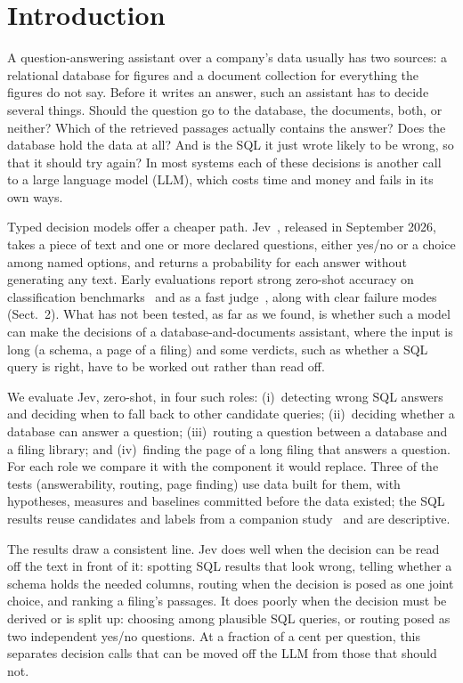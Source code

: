 \documentclass[runningheads,a4paper]{llncs}
\begin{document}
\section{Introduction}
A question-answering assistant over a company's data usually has two sources: a relational database for figures
and a document collection for everything the figures do not say. Before it writes an answer, such an assistant has
to decide several things. Should the question go to the database, the documents, both, or neither? Which of the
retrieved passages actually contains the answer? Does the database hold the data at all? And is the SQL it just
wrote likely to be wrong, so that it should try again? In most systems each of these decisions is another call to a
large language model (LLM), which costs time and money and fails in its own ways.

Typed decision models offer a cheaper path. Jev~\cite{typesafe2026jev}, released in September 2026, takes a piece of
text and one or more declared questions, either yes/no or a choice among named options, and returns a probability
for each answer without generating any text. Early evaluations report strong zero-shot accuracy on classification benchmarks~\cite{deusser2026jev} and as a fast
judge~\cite{li2026jevjudge}, along with clear failure modes (Sect.~2). What has not been tested, as far as we found, is whether such a
model can make the decisions of a database-and-documents assistant, where the input is long (a schema, a page of a
filing) and some verdicts, such as whether a SQL query is right, have to be worked out rather than read off.

We evaluate Jev, zero-shot, in four such roles: (i)~detecting wrong SQL answers and deciding when to fall back to
other candidate queries; (ii)~deciding whether a database can answer a question; (iii)~routing a question between
a database and a filing library; and (iv)~finding the page of a long filing that answers a question. For each role
we compare it with the component it would replace. Three of the tests (answerability, routing, page finding) use
data built for them, with hypotheses, measures and baselines committed before the data existed; the SQL results
reuse candidates and labels from a companion study~\cite{companion2026warnings} and are descriptive.

The results draw a consistent line. Jev does well when the decision can be read off the text in front of it:
spotting SQL results that look wrong, telling whether a schema holds the needed columns, routing when the decision
is posed as one joint choice, and ranking a filing's passages. It does poorly when the decision must be derived or is
split up: choosing among plausible SQL queries, or routing posed as two independent yes/no questions. At a fraction
of a cent per question, this separates decision calls that can be moved off the LLM from those that should not.
\end{document}
